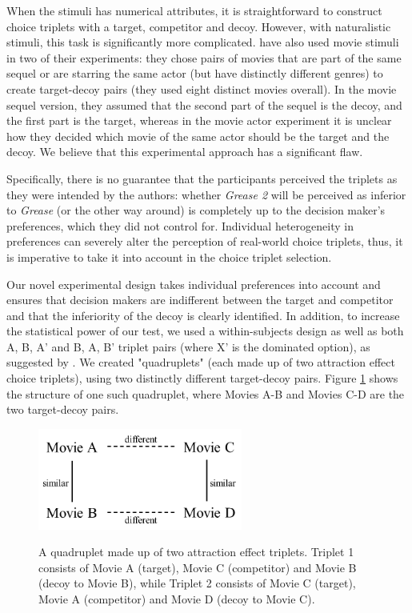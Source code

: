 \documentclass[12pt, a4paper]{article}
\begin{document}
When the stimuli has numerical attributes, it is straightforward to construct choice triplets with a target, competitor and decoy. However, with naturalistic stimuli, this task is significantly more complicated. \citeauthor{Frederick2014} have also used movie stimuli in two of their experiments: they chose pairs of movies that are part of the same sequel or are starring the same actor (but have distinctly different genres) to create target-decoy pairs (they used eight distinct movies overall). In the movie sequel version, they assumed that the second part of the sequel is the decoy, and the first part is the target, whereas in the movie actor experiment it is unclear how they decided which movie of the same actor should be the target and the decoy. We believe that this experimental approach has a significant flaw. 

Specifically, there is no guarantee that the participants perceived the triplets as they were intended by the authors: whether \textit{Grease 2} will be perceived as inferior to \textit{Grease} (or the other way around) is completely up to the decision maker's preferences, which they did not control for. Individual heterogeneity in preferences can severely alter the perception of real-world choice triplets, thus, it is imperative to take it into account in the choice triplet selection. 

Our novel experimental design takes individual preferences into account and ensures that decision makers are indifferent between the target and competitor and that the inferiority of the decoy is clearly identified. In addition, to increase the statistical power of our test, we used a within-subjects design as well as both A, B, A' and B, A, B' triplet pairs (where X' is the dominated option), as suggested by . We created "quadruplets" (each made up of two attraction effect choice triplets), using two distinctly different target-decoy pairs. Figure \ref{fig:quadruplets} shows the structure of one such quadruplet, where Movies A-B and Movies C-D are the two target-decoy pairs.


 \begin{figure}
\centering
\captionsetup{justification=centering}
\caption{A quadruplet made up of two attraction effect triplets. Triplet 1 consists of Movie A (target), Movie C (competitor) and Movie B (decoy to Movie B), while Triplet 2 consists of Movie C (target), Movie A (competitor) and Movie D (decoy to Movie C).}
\includegraphics[width=0.6\textwidth]{quadruplets.png}
\label{fig:quadruplets}
\end{figure}
\end{document}

